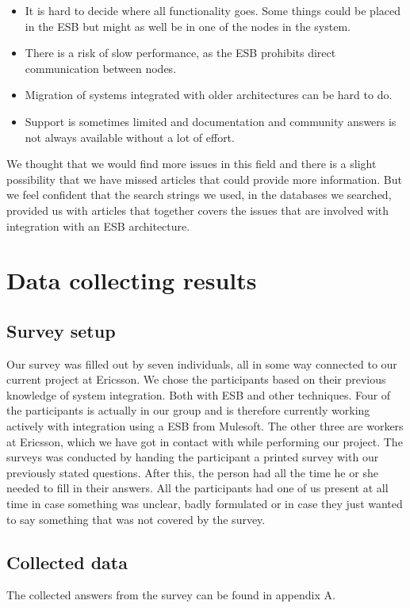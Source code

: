 \documentclass{llncs}
\begin{document}
\begin{itemize}
\item It is hard to decide where all functionality goes. Some things could be placed in the ESB but might as well be in one of the nodes in the system.
\item There is a risk of slow performance, as the ESB prohibits direct communication between nodes.
\item Migration of systems integrated with older architectures can be hard to do.
\item Support is sometimes limited and documentation and community answers is not always available without a lot of effort.
\end{itemize}

We thought that we would find more issues in this field and there is a slight possibility that we have missed articles that could provide more information. But we feel confident that the search strings we used, in the databases we searched, provided us with articles that together covers the issues that are involved with integration with an ESB architecture.

\section{Data collecting results}

\subsection{Survey setup}
Our survey was filled out by seven individuals, all in some way connected to our current project at Ericsson. We chose the participants based on their previous knowledge of system integration. Both with ESB and other techniques. Four of the participants is actually in our group and is therefore currently working actively with integration using a ESB from Mulesoft. The other three are workers at Ericsson, which we have got in contact with while performing our project.
The surveys was conducted by handing the participant a printed survey with our previously stated questions. After this, the person had all the time he or she needed to fill in their answers.
All the participants had one of us present at all time in case something was unclear, badly formulated or in case they just wanted to say something that was not covered by the survey.

\subsection{Collected data}
The collected answers from the survey can be found in appendix A.
\end{document}

